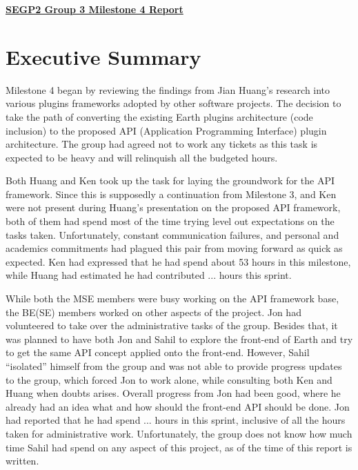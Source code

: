 \documentclass{article}
\begin{document}
\pagestyle{headings}

\begin{center}
{\textbf{\underline{SEGP2 Group 3 Milestone 4 Report}}}
\end{center}


\section*{Executive Summary}

Milestone 4 began by reviewing the findings from Jian Huang's research into various plugins frameworks adopted by other software projects. The decision to take the path of converting the existing Earth plugins architecture (code inclusion) to the proposed API (Application Programming Interface) plugin architecture. The group had agreed not to work any tickets as this task is expected to be heavy and will relinquish all the budgeted hours. 

Both Huang and Ken took up the task for laying the groundwork for the API framework. Since this is supposedly a continuation from Milestone 3, and Ken were not present during Huang's presentation on the proposed API framework, both of them had spend most of the time trying level out expectations on the tasks taken. Unfortunately, constant communication failures, and personal and academics commitments had plagued this pair from moving forward as quick as expected. Ken had expressed that he had spend about 53 hours in this milestone, while Huang had estimated he had contributed ... hours this sprint. 

While both the MSE members were busy working on the API framework base, the BE(SE) members worked on other aspects of the project. Jon had volunteered to take over the administrative tasks of the group. Besides that, it was planned to have both Jon and Sahil to explore the front-end of Earth and try to get the same API concept applied onto the front-end. However, Sahil ``isolated'' himself from the group and was not able to provide progress updates to the group, which forced Jon to work alone, while consulting both Ken and Huang when doubts arises. Overall progress from Jon had been good, where he already had an idea what and how should the front-end API should be done. Jon had reported that he had spend ... hours in this sprint, inclusive of all the hours taken for administrative work. Unfortunately, the group does not know how much time Sahil had spend on any aspect of this project, as of the time of this report is written. 
\end{document}

